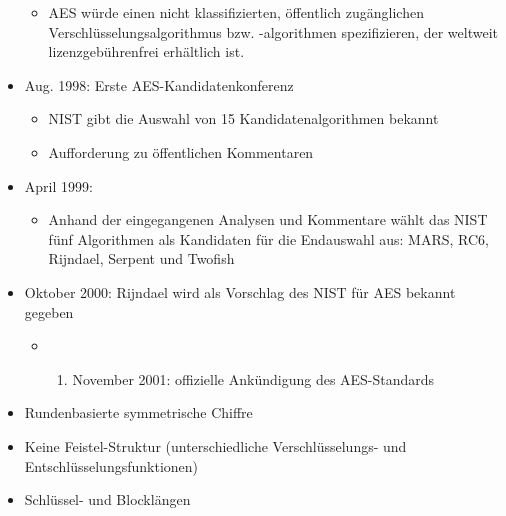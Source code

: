 \documentclass[a4paper]{article}
\begin{document}
\begin{multicols}{3}
\begin{itemize}
              \begin{itemize}
                  \item
                        AES würde einen nicht klassifizierten, öffentlich zugänglichen
                        Verschlüsselungsalgorithmus bzw. -algorithmen spezifizieren, der
                        weltweit lizenzgebührenfrei erhältlich ist.
              \end{itemize}
        \item
              Aug. 1998: Erste AES-Kandidatenkonferenz

              \begin{itemize}
                  \item
                        NIST gibt die Auswahl von 15 Kandidatenalgorithmen bekannt
                  \item
                        Aufforderung zu öffentlichen Kommentaren
              \end{itemize}
        \item
              April 1999:

              \begin{itemize}
                  \item
                        Anhand der eingegangenen Analysen und Kommentare wählt das NIST fünf
                        Algorithmen als Kandidaten für die Endauswahl aus: MARS, RC6,
                        Rijndael, Serpent und Twofish
              \end{itemize}
        \item
              Oktober 2000: Rijndael wird als Vorschlag des NIST für AES bekannt
              gegeben

              \begin{itemize}
                  \item
                        \begin{enumerate}
                            \def\labelenumi{\arabic{enumi}.}
                            \setcounter{enumi}{25}
                            \item
                                  November 2001: offizielle Ankündigung des AES-Standards
                        \end{enumerate}
              \end{itemize}
        \item
              Rundenbasierte symmetrische Chiffre
        \item
              Keine Feistel-Struktur (unterschiedliche Verschlüsselungs- und
              Entschlüsselungsfunktionen)
        \item
              Schlüssel- und Blocklängen


\end{itemize}
\end{multicols}
\end{document}
